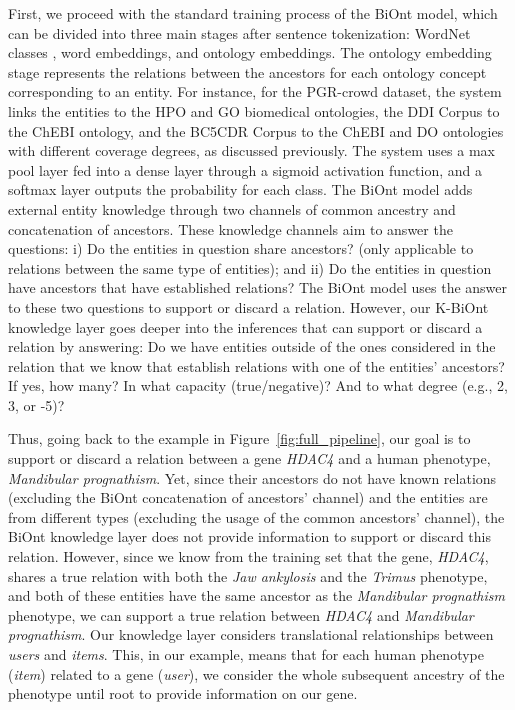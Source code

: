 First, we proceed with the standard training process of the BiOnt model, which can be divided into three main stages after sentence tokenization: WordNet classes \citep{ciaramita2006broad}, word embeddings, and ontology embeddings. The ontology embedding stage represents the relations between the ancestors for each ontology concept corresponding to an entity. For instance, for the PGR-crowd dataset, the system links the entities to the HPO and GO biomedical ontologies, the DDI Corpus to the ChEBI ontology, and the BC5CDR Corpus to the ChEBI and DO ontologies with different coverage degrees, as discussed previously. The system uses a max pool layer fed into a dense layer through a sigmoid activation function, and a softmax layer outputs the probability for each class. The BiOnt model adds external entity knowledge through two channels of common ancestry and concatenation of ancestors. These knowledge channels aim to answer the questions: i) Do the entities in question share ancestors? (only applicable to relations between the same type of entities); and ii) Do the entities in question have ancestors that have established relations? The BiOnt model uses the answer to these two questions to support or discard a relation. However, our K-BiOnt knowledge layer goes deeper into the inferences that can support or discard a relation by answering: Do we have entities outside of the ones considered in the relation that we know that establish relations with one of the entities' ancestors? If yes, how many? In what capacity (true/negative)? And to what degree (e.g., 2, 3, or -5)? 


Thus, going back to the example in Figure~\ref{fig:full_pipeline}, our goal is to support or discard a relation between a gene \textit{HDAC4} and a human phenotype, \textit{Mandibular prognathism}. Yet, since their ancestors do not have known relations (excluding the BiOnt concatenation of ancestors' channel) and the entities are from different types (excluding the usage of the common ancestors' channel), the BiOnt knowledge layer does not provide information to support or discard this relation. However, since we know from the training set that the gene, \textit{HDAC4}, shares a true relation with both the \textit{Jaw ankylosis} and the \textit{Trimus} phenotype, and both of these entities have the same ancestor as the \textit{Mandibular prognathism} phenotype, we can support a true relation between \textit{HDAC4} and \textit{Mandibular prognathism}. Our knowledge layer considers translational relationships between \textit{users} and \textit{items}. This, in our example, means that for each human phenotype (\textit{item}) related to a gene (\textit{user}), we consider the whole subsequent ancestry of the phenotype until root to provide information on our gene.  



